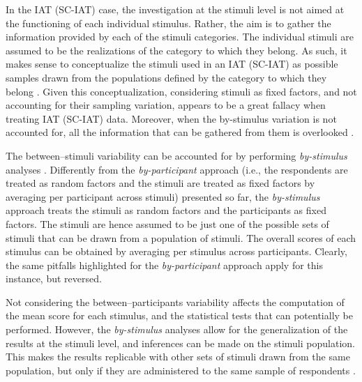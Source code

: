 \documentclass[12pt]{book}
\begin{document}
In the IAT (SC-IAT) case, the investigation at the stimuli level is not aimed at the functioning of each individual stimulus. Rather, the aim is to gather the information provided by each of the stimuli categories. The individual stimuli are assumed to be the realizations of the category to which they belong. 
As such, it makes sense to conceptualize the stimuli used in an IAT (SC-IAT) as possible samples drawn from the populations defined by the category to which they belong \cite{wols2017}. 
Given this conceptualization, considering stimuli as fixed factors, and not accounting for their sampling variation, appears to be a great fallacy when treating IAT (SC-IAT) data. Moreover, when the by-stimulus variation is not accounted for, all the information that can be gathered from them is overlooked \cite{wols2017}.

The between--stimuli variability can be accounted for by performing \emph{by-stimulus} analyses \cite{judd2012}. 
Differently from the \emph{by-participant} approach (i.e., the respondents are treated as random factors and the stimuli are treated as fixed factors by averaging per participant across stimuli) presented so far, the \emph{by-stimulus} approach treats the stimuli as random factors and the participants as fixed factors. 
The stimuli are hence assumed to be just one of the possible sets of stimuli that can be drawn from a population of stimuli. 
The overall scores of each stimulus can be obtained by averaging per stimulus across participants. 
Clearly, the same pitfalls highlighted for the \emph{by-participant} approach apply for this instance, but reversed. 

Not considering the between--participants variability affects the computation of the mean score for each stimulus, and the statistical tests that can potentially be performed.  
However, the \emph{by-stimulus} analyses allow for the generalization of the results at the stimuli level, and  inferences can be made on the stimuli population. This makes the results replicable with other sets of stimuli drawn from the same population, but only if they are administered to the same sample of respondents \cite{judd2012}. 
 
\end{document}
